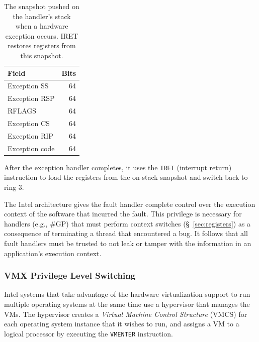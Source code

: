 \begin{table}[hbt]
  \centering
  \begin{tabular}{| l | r |}
  \hline
  \textbf{Field} & \textbf{Bits} \\
  \hline
  Exception SS & 64 \\
  \hline
  Exception RSP & 64 \\
  \hline
  RFLAGS & 64 \\
  \hline
  Exception CS & 64 \\
  \hline
  Exception RIP & 64 \\
  \hline
  Exception code & 64 \\
  \hline
  \end{tabular}
  \caption{
    The snapshot pushed on the handler's stack when a hardware exception
    occurs. IRET restores registers from this snapshot.
  }
  \label{fig:fault_stack}
\end{table}

After the exception handler completes, it uses the \texttt{IRET} (interrupt
return) instruction to load the registers from the on-stack snapshot and switch
back to ring 3.

The Intel architecture gives the fault handler complete control over the
execution context of the software that incurred the fault. This privilege is
necessary for handlers (e.g., \#GP) that must perform context switches
(\S~\ref{sec:registers}) as a consequence of terminating a thread that
encountered a bug. It follows that all fault handlers must be trusted to not
leak or tamper with the information in an application's execution context.


\subsubsection{VMX Privilege Level Switching}
\label{sec:vmx}


Intel systems that take advantage of the hardware virtualization support to run
multiple operating systems at the same time use a hypervisor that manages the
VMs. The hypervisor creates a \textit{Virtual Machine Control Structure} (VMCS)
for each operating system instance that it wishes to run, and assigns a VM to a
logical processor by executing the \texttt{VMENTER} instruction.



